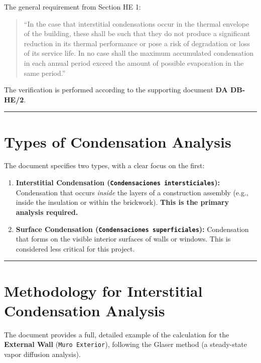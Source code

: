 \documentclass[
  10pt,
  letterpaper,
]{scrbook}
\providecommand{\tightlist}{%
  \setlength{\itemsep}{0pt}\setlength{\parskip}{0pt}}
\begin{document}
The general requirement from Section HE 1:

\begin{quote}
``In the case that interstitial condensations occur in the thermal
envelope of the building, these shall be such that they do not produce a
significant reduction in its thermal performance or pose a risk of
degradation or loss of its service life. In no case shall the maximum
accumulated condensation in each annual period exceed the amount of
possible evaporation in the same period.''
\end{quote}

The verification is performed according to the supporting document
\textbf{DA DB-HE/2}.

\begin{center}\rule{0.5\linewidth}{0.5pt}\end{center}

\section{Types of Condensation
Analysis}\label{types-of-condensation-analysis}

The document specifies two types, with a clear focus on the first:

\begin{enumerate}
\def\labelenumi{\arabic{enumi}.}
\tightlist
\item
  \textbf{Interstitial Condensation
  (\texttt{Condensaciones\ intersticiales}):} Condensation that occurs
  \emph{inside} the layers of a construction assembly (e.g., inside the
  insulation or within the brickwork). \textbf{This is the primary
  analysis required.}
\item
  \textbf{Surface Condensation
  (\texttt{Condensaciones\ superficiales}):} Condensation that forms on
  the visible interior surfaces of walls or windows. This is considered
  less critical for this project.
\end{enumerate}

\begin{center}\rule{0.5\linewidth}{0.5pt}\end{center}

\section{Methodology for Interstitial Condensation
Analysis}\label{methodology-for-interstitial-condensation-analysis}

The document provides a full, detailed example of the calculation for
the \textbf{External Wall} (\texttt{Muro\ Exterior}), following the
Glaser method (a steady-state vapor diffusion analysis).
\end{document}
